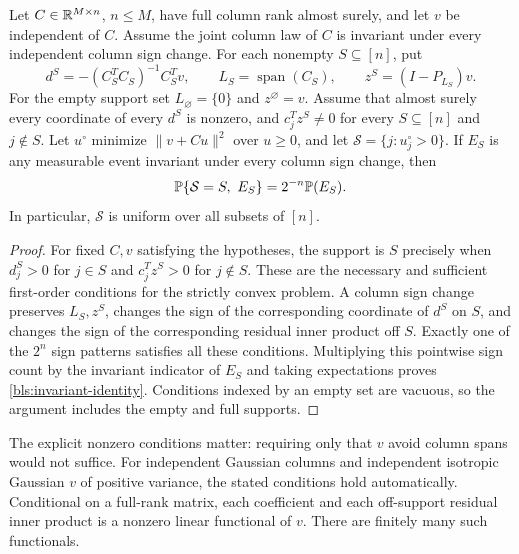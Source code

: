 \begin{lemma}
\label{bls:sign-orbit}
Let $C\in\mathbb{R}^{M\times n}$, $n\le M$, have full column rank almost surely,
and let $v$ be independent of $C$.  Assume the joint column law of $C$ is
invariant under every independent column sign change.  For each nonempty
$S\subseteq[n]$, put
\[
 d^S=-(C_S^TC_S)^{-1}C_S^Tv,\qquad
 L_S=\operatorname{span}(C_S),\qquad z^S=(I-P_{L_S})v.
\]
For the empty support set $L_\varnothing=\{0\}$ and $z^\varnothing=v$.
Assume that almost surely every coordinate of every $d^S$ is nonzero,
and $c_j^Tz^S\ne0$ for every $S\subseteq[n]$ and $j\notin S$.
Let $u^\circ$ minimize $\|v+Cu\|^2$ over $u\ge0$, and let
$\mathcal S=\{j:u_j^\circ>0\}$.  If $E_S$ is any measurable event
invariant under every column sign change, then
\begin{equation}
 \mathbb{P}\{\mathcal S=S,\ E_S\}=2^{-n}\mathbb{P}(E_S).
 \label{bls:invariant-identity}
\end{equation}
In particular, $\mathcal S$ is uniform over all subsets of $[n]$.
\end{lemma}

\begin{proof}
For fixed $C,v$ satisfying the hypotheses, the support is $S$ precisely
when $d_j^S>0$ for $j\in S$ and $c_j^Tz^S>0$ for $j\notin S$.
These are the necessary and sufficient first-order conditions for the
strictly convex problem.  A column sign change preserves $L_S,z^S$,
changes the sign of the corresponding coordinate of $d^S$ on $S$, and
changes the sign of the corresponding residual inner product off $S$.
Exactly one of the $2^n$ sign patterns satisfies all these conditions.
Multiplying this pointwise sign count by the invariant indicator of $E_S$
and taking expectations proves \eqref{bls:invariant-identity}.  Conditions
indexed by an empty set are vacuous, so the argument includes the empty
and full supports.
\end{proof}

The explicit nonzero conditions matter: requiring only that $v$ avoid
column spans would not suffice.  For independent Gaussian columns and
independent isotropic Gaussian $v$ of positive variance, the stated
conditions hold automatically.  Conditional on a full-rank matrix, each
coefficient and each off-support residual inner product is a nonzero
linear functional of $v$.  There are finitely many such functionals.


